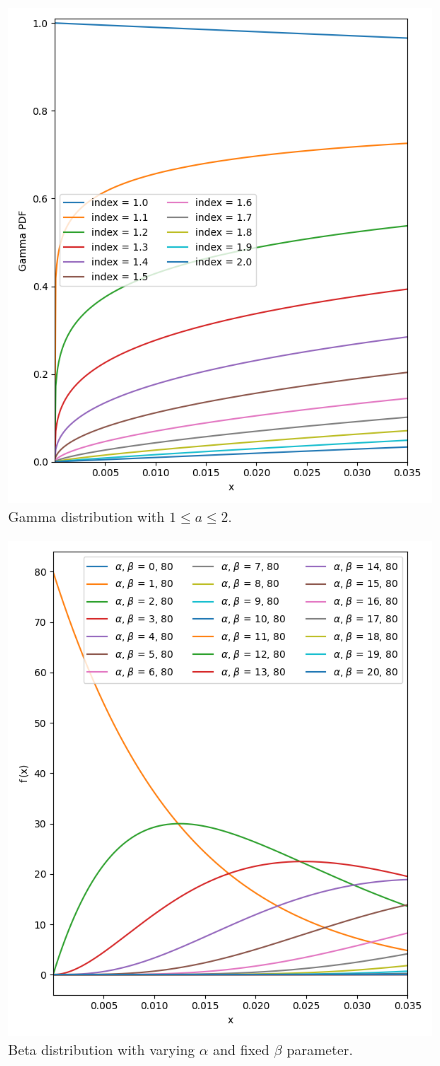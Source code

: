 \begin{figure}[!ht]%
	\centering
	\includegraphics[width=\linewidth]{images/gamma}
	\caption{Gamma distribution with $1 \leq a \leq 2$.}
	\label{fig:gamma_distribution}
\end{figure}%
\begin{figure}[!ht]%
    \centering
    \includegraphics[width=\linewidth]{images/beta1}
    \caption{Beta distribution with varying $\alpha$ and fixed $\beta$ parameter.}
    \label{fig:beta1}
\end{figure}%
